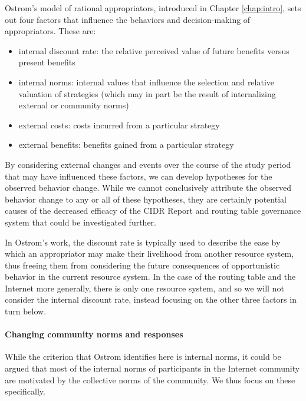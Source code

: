 Ostrom's model of rational appropriators, introduced in Chapter
\ref{chap:intro}, sets out four factors that influence the behaviors and
decision-making of appropriators. These are:

\begin{itemize}
    \item{internal discount rate: the relative perceived value of future
    benefits versus present benefits}
    \item{internal norms: internal values that influence the selection and
    relative valuation of strategies (which may in part be the result of
    internalizing external or community norms)}
    \item{external costs: costs incurred from a particular strategy}
    \item{external benefits: benefits gained from a particular strategy}
\end{itemize}

By considering external changes and events over the course of the study period
that may have influenced these factors, we can develop hypotheses for the
observed behavior change. While we cannot conclusively attribute the observed
behavior change to any or all of these hypotheses, they are certainly potential
causes of the decreased efficacy of the CIDR Report and routing table
governance system that could be investigated further.

In Ostrom's work, the discount rate is typically used to describe the ease by
which an appropriator may make their livelihood from another resource system,
thus freeing them from considering the future consequences of opportunistic
behavior in the current resource system.  In the case of the routing table and
the Internet more generally, there is only one resource system, and so we will
not consider the internal discount rate, instead focusing on the other three
factors in turn below.

\paragraph{Changing community norms and responses}

While the criterion that Ostrom identifies here is internal norms, it could be
argued that most of the internal norms of participants in the Internet
community are motivated by the collective norms of the community. We thus focus
on these specifically.

